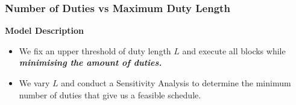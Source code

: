 \documentclass[handout]{beamer}
\begin{document}

\begin{frame}
	\frametitle{Number of Duties vs Maximum Duty Length}
	
			    \vspace{\baselineskip}
		    \textbf{Model Description}
			\begin{itemize}
                \item \small{We fix an upper threshold of duty length \textbf{$L$} and execute all blocks while \textbf{\textit{minimising the amount of duties.}}}
				\item We vary \textbf{$L$} and conduct a Sensitivity Analysis to determine the minimum number of duties that give us a feasible schedule.
			\end{itemize}	
	
\vspace{\baselineskip}
			\centering
		    


\end{frame}


\end{document}
